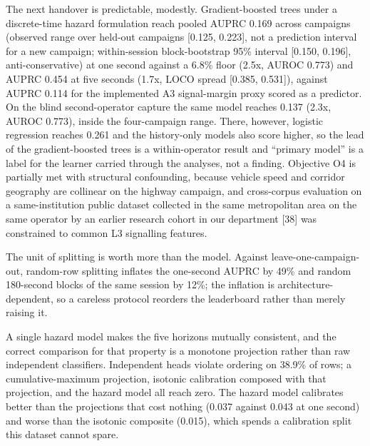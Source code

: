 The next handover is predictable, modestly. Gradient-boosted trees under a discrete-time hazard formulation reach pooled AUPRC 0.169 across campaigns (observed range over held-out campaigns [0.125, 0.223], not a prediction interval for a new campaign; within-session block-bootstrap 95\% interval [0.150, 0.196], anti-conservative) at one second against a 6.8\% floor (2.5x, AUROC 0.773) and AUPRC 0.454 at five seconds (1.7x, LOCO spread [0.385, 0.531]), against AUPRC 0.114 for the implemented A3 signal-margin proxy scored as a predictor. On the blind second-operator capture the same model reaches 0.137 (2.3x, AUROC 0.773), inside the four-campaign range. There, however, logistic regression reaches 0.261 and the history-only models also score higher, so the lead of the gradient-boosted trees is a within-operator result and ``primary model'' is a label for the learner carried through the analyses, not a finding. Objective O4 is partially met with structural confounding, because vehicle speed and corridor geography are collinear on the highway campaign, and cross-corpus evaluation on a same-institution public dataset collected in the same metropolitan area on the same operator by an earlier research cohort in our department [38] was constrained to common L3 signalling features.

The unit of splitting is worth more than the model. Against leave-one-campaign-out, random-row splitting inflates the one-second AUPRC by 49\% and random 180-second blocks of the same session by 12\%; the inflation is architecture-dependent, so a careless protocol reorders the leaderboard rather than merely raising it.

A single hazard model makes the five horizons mutually consistent, and the correct comparison for that property is a monotone projection rather than raw independent classifiers. Independent heads violate ordering on 38.9\% of rows; a cumulative-maximum projection, isotonic calibration composed with that projection, and the hazard model all reach zero. The hazard model calibrates better than the projections that cost nothing (0.037 against 0.043 at one second) and worse than the isotonic composite (0.015), which spends a calibration split this dataset cannot spare.


